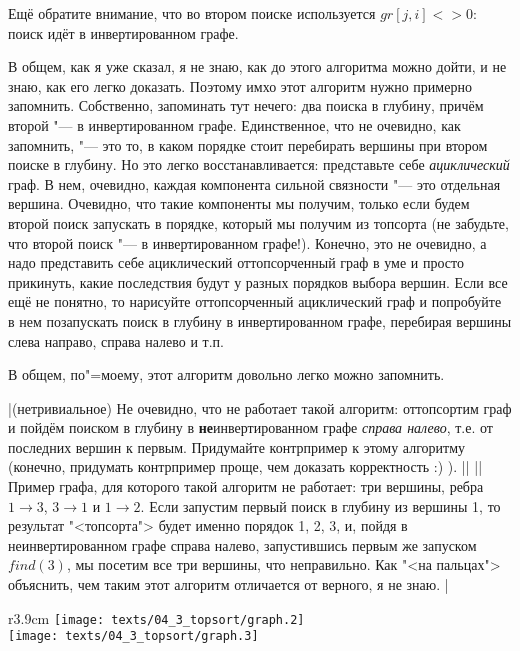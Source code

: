 Ещё обратите внимание, что во втором поиске используется $gr[j,i]<>0$: поиск идёт в инвертированном графе.

В общем, как я уже сказал, я не знаю, как до этого алгоритма можно дойти, и не знаю, как его легко доказать. Поэтому
имхо этот алгоритм нужно примерно запомнить. Собственно, запоминать тут нечего: два поиска в глубину, причём второй
"--- в инвертированном графе. Единственное, что не очевидно, как запомнить, "--- это то, в каком порядке стоит перебирать
вершины при втором поиске в глубину. Но это легко восстанавливается: представьте себе \textit{ациклический} граф.
В нем, очевидно, каждая компонента сильной связности "--- это отдельная вершина. Очевидно, что такие компоненты
мы получим, только если будем второй поиск запускать в порядке, который мы получим из топсорта (не забудьте, что 
второй поиск "--- в инвертированном графе!). Конечно, это не очевидно, а надо представить себе ациклический 
оттопсорченный граф в уме и просто прикинуть, какие последствия будут у разных порядков выбора вершин. Если все ещё 
не понятно, то нарисуйте оттопсорченный ациклический граф и попробуйте в нем позапускать поиск в глубину в инвертированном
графе, перебирая вершины слева направо, справа налево и т.п. 

В общем, по"=моему, этот алгоритм довольно легко можно запомнить.

\task|(нетривиальное) Не очевидно, что не работает такой алгоритм: оттопсортим граф и пойдём поиском в глубину в 
\textbf{не}инвертированном графе \emph{справа налево}, т.е. от последних вершин к первым. Придумайте контрпример
к этому алгоритму (конечно, придумать контрпример проще, чем доказать корректность :) ).
||
||Пример графа, для которого такой алгоритм не работает: три вершины, ребра $1\to 3$, $3\to 1$ и $1\to 2$.
Если запустим первый поиск в глубину из вершины 1, то результат "<топсорта"> будет именно порядок 1, 2, 3, и,
пойдя в неинвертированном графе справа налево, запустившись первым же запуском $find(3)$, мы посетим все три
вершины, что неправильно. Как "<на пальцах"> объяснить, чем таким этот алгоритм отличается от верного, я не знаю.
|\label{badSCC}


\begin{wrapfigure}{r}{3.9cm}
\vspace{-0.3cm}
\texttt{[image: texts/04\_3\_topsort/graph.2]}\\[0.2cm]
\texttt{[image: texts/04\_3\_topsort/graph.3]}
\end{wrapfigure}

